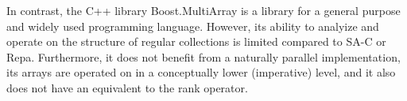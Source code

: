 In contrast, the C++ library Boost.MultiArray is a library for a general purpose and widely used programming language. \cite{boost}
However, its ability to analyize and operate on the structure of regular collections is limited compared to SA-C or Repa.
Furthermore, it does not benefit from a naturally parallel implementation, 
its arrays are operated on in a conceptually lower (imperative) level, 
and it also does not have an equivalent to the rank operator. 
